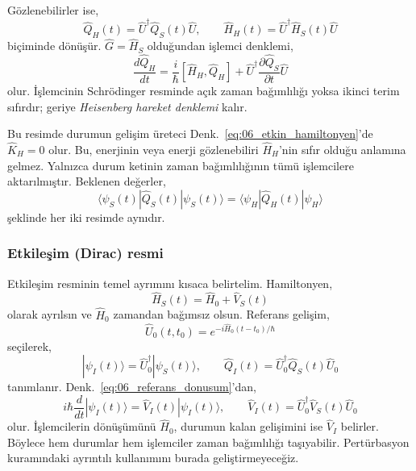 \documentclass[00_kitap.tex]{subfiles}
\begin{document}
Gözlenebilirler ise,
\begin{equation}
 \hat Q_H(t)=\hat U^\dagger\hat Q_S(t)\hat U,
 \qquad \hat H_H(t)=\hat U^\dagger\hat H_S(t)\hat U
\end{equation}
biçiminde dönüşür. $\hat G=\hat H_S$ olduğundan işlemci denklemi,
\begin{equation}
 \boxed{\frac{d\hat Q_H}{dt}
 =\frac{i}{\hbar}[\hat H_H,\hat Q_H]
  +\hat U^\dagger\frac{\partial\hat Q_S}{\partial t}\hat U}
 \label{eq:06_heisenberg_denkl}
\end{equation}
olur. İşlemcinin Schrödinger resminde açık zaman bağımlılığı
yoksa ikinci terim sıfırdır; geriye \emph{Heisenberg hareket
denklemi} kalır.

Bu resimde durumun gelişim üreteci
Denk.~\eqref{eq:06_etkin_hamiltonyen}'de $\hat K_H=0$ olur.
Bu, enerjinin veya enerji gözlenebiliri $\hat H_H$'nin sıfır
olduğu anlamına gelmez. Yalnızca durum ketinin zaman bağımlılığının
tümü işlemcilere aktarılmıştır. Beklenen değerler,
\begin{equation}
 \langle\psi_S(t)|\hat Q_S(t)|\psi_S(t)\rangle
 =\langle\psi_H|\hat Q_H(t)|\psi_H\rangle
\end{equation}
şeklinde her iki resimde aynıdır.

\subsubsection{Etkileşim (Dirac) resmi}

Etkileşim resminin temel ayrımını kısaca belirtelim. Hamiltonyen,
\begin{equation}
 \hat H_S(t)=\hat H_0+\hat V_S(t)
\end{equation}
olarak ayrılsın ve $\hat H_0$ zamandan bağımsız olsun. Referans
gelişim,
\begin{equation}
 \hat U_0(t,t_0)=e^{-i\hat H_0(t-t_0)/\hbar}
\end{equation}
seçilerek,
\begin{equation}
 |\psi_I(t)\rangle=\hat U_0^\dagger|\psi_S(t)\rangle,
 \qquad\hat Q_I(t)=\hat U_0^\dagger\hat Q_S(t)\hat U_0
\end{equation}
tanımlanır. Denk.~\eqref{eq:06_referans_donusum}'dan,
\begin{equation}
 \boxed{i\hbar\frac{d}{dt}|\psi_I(t)\rangle
       =\hat V_I(t)|\psi_I(t)\rangle,
 \qquad\hat V_I(t)=\hat U_0^\dagger\hat V_S(t)\hat U_0}
\end{equation}
olur. İşlemcilerin dönüşümünü $\hat H_0$, durumun kalan gelişimini
ise $\hat V_I$ belirler. Böylece hem durumlar hem işlemciler zaman
bağımlılığı taşıyabilir. Pertürbasyon kuramındaki ayrıntılı kullanımını
burada geliştirmeyeceğiz.
\end{document}
